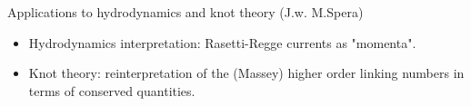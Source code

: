 \documentclass[handout,10pt]{beamer}
\begin{document}
\begin{frame}[t]{Applications to hydrodynamics and knot theory \small(J.w. M.Spera)}
		\vfill
		\begin{itemize}[<+->]%
			\item[\CheckedBox]  Hydrodynamics interpretation: Rasetti-Regge currents as "momenta".
			\item[\CheckedBox]  Knot theory: reinterpretation of the (Massey) higher order linking numbers in terms of conserved quantities.
		\end{itemize}
	\end{frame}





\end{document}
